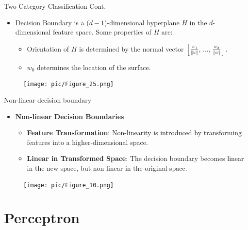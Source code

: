 \documentclass[serif, aspectratio=169]{beamer}
\begin{document}
\begin{frame}{Two Category Classification Cont.}
    \begin{itemize}\itemsep1.5em
        \item Decision Boundary is a (\(d - 1\))-dimensional hyperplane \(H\) in the \(d\)-dimensional feature space. Some properties of \(H\) are:
        \medskip
        \begin{itemize}\itemsep0.7em
            \item Orientation of \(H\) is determined by the normal vector \([\frac{w_1}{\Vert w \Vert} , \, ..., \, \frac{w_d}{\Vert w \Vert}]\).
            \item \(w_0\) determines the location of the surface.
        \end{itemize}
    \end{itemize}
    \begin{figure}
        \centering
        \texttt{[image: pic/Figure\_25.png]}
    \end{figure}
\end{frame}

\begin{frame}{Non-linear decision boundary}
    \begin{itemize}
        \item \textbf{Non-linear Decision Boundaries}
        \begin{itemize}\itemsep1em
            \item \justifying \textbf{Feature Transformation}: Non-linearity is introduced by transforming features into a higher-dimensional space.
            \item \justifying \textbf{Linear in Transformed Space}: The decision boundary becomes linear in the new space, but non-linear in the original space.
        \end{itemize}
    \end{itemize}
    \endminipage
    \hfill
        \begin{figure}[bh]
            \texttt{[image: pic/Figure\_10.png]}
        \end{figure}
    \endminipage
\end{frame}


\section{Perceptron}
\end{document}
